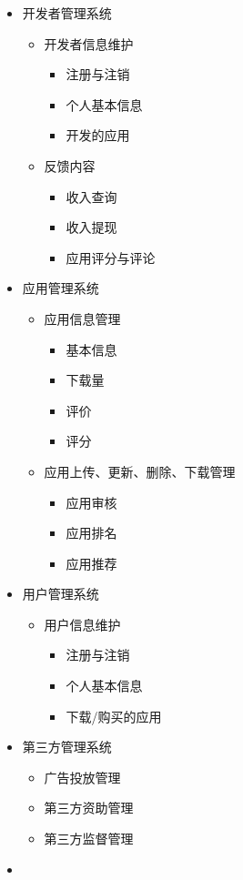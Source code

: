 \begin{itemize}
\item 开发者管理系统
	\begin{itemize}
	\item 开发者信息维护
		\begin{itemize}
		\item 注册与注销
		\item 个人基本信息
		\item 开发的应用
		\end{itemize}
	\item 反馈内容
		\begin{itemize}
			\item 收入查询
			\item 收入提现
			\item 应用评分与评论
		\end{itemize}
	\end{itemize}
\item 应用管理系统
	\begin{itemize}
	\item 应用信息管理
		\begin{itemize}
		\item 基本信息
		\item 下载量
		\item 评价
		\item 评分
		\end{itemize}
	\item 应用上传、更新、删除、下载管理
		\begin{itemize}
			\item 应⽤审核
			\item 应⽤排名
			\item 应⽤推荐
		\end{itemize}
	\end{itemize}
\item ⽤户管理系统
	\begin{itemize}
	\item 用户信息维护
	\begin{itemize}
		\item 注册与注销
		\item 个人基本信息
		\item 下载/购买的应用
	\end{itemize}
	\end{itemize}
\item 第三方管理系统
	\begin{itemize}
	\item ⼴告投放管理
	\item 第三方资助管理
	\item 第三方监督管理
	\end{itemize}
\item \color{red}{应用开发管理系统}
\color{red}{
	\begin{itemize}
		\item 在线开发
		\item 在线预览
	\end{itemize}
}
\end{itemize}
	
